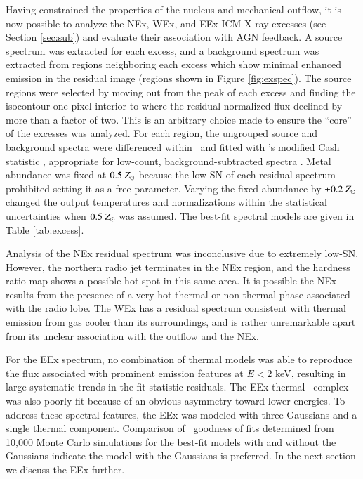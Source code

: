 \documentclass[referee,traditabstract]{aa}
\begin{document}
Having constrained the properties of the nucleus and mechanical
outflow, it is now possible to analyze the NEx, WEx, and EEx ICM X-ray
excesses (see Section \ref{sec:sub}) and evaluate their association
with AGN feedback. A source spectrum was extracted for each excess,
and a background spectrum was extracted from regions neighboring each
excess which show minimal enhanced emission in the residual image
(regions shown in Figure \ref{fig:exspec}). The source regions were
selected by moving out from the peak of each excess and finding the
isocontour one pixel interior to where the residual normalized flux
declined by more than a factor of two. This is an arbitrary choice
made to ensure the ``core'' of the excesses was analyzed. For each
region, the ungrouped source and background spectra were differenced
within \xspec\ and fitted with \xspec's modified Cash statistic
\citep{1979ApJ...228..939C}, appropriate for low-count,
background-subtracted spectra \citep[see \xspec\ Manual Appendix B
  and][]{1989ApJ...342.1207N}. Metal abundance was fixed at $0.5
~Z_{\odot}$ because the low-SN of each residual spectrum prohibited
setting it as a free parameter. Varying the fixed abundance by $\pm
0.2 ~Z_{\odot}$ changed the output temperatures and normalizations within
the statistical uncertainties when $0.5 ~Z_{\odot}$ was assumed. The
best-fit spectral models are given in Table \ref{tab:excess}.

Analysis of the NEx residual spectrum was inconclusive due to
extremely low-SN. However, the northern radio jet terminates in the
NEx region, and the hardness ratio map shows a possible hot spot in
this same area. It is possible the NEx results from the presence of a
very hot thermal or non-thermal phase associated with the radio
lobe. The WEx has a residual spectrum consistent with thermal emission
from gas cooler than its surroundings, and is rather unremarkable
apart from its unclear association with the outflow and the NEx.

For the EEx spectrum, no combination of thermal models was able to
reproduce the flux associated with prominent emission features at $E <
2$ keV, resulting in large systematic trends in the fit statistic
residuals. The EEx thermal \feka\ complex was also poorly fit because
of an obvious asymmetry toward lower energies. To address these
spectral features, the EEx was modeled with three Gaussians and a
single thermal component. Comparison of \chisq\ goodness of fits
determined from 10,000 Monte Carlo simulations for the best-fit models
with and without the Gaussians indicate the model with the Gaussians
is preferred. In the next section we discuss the EEx further.
\end{document}
